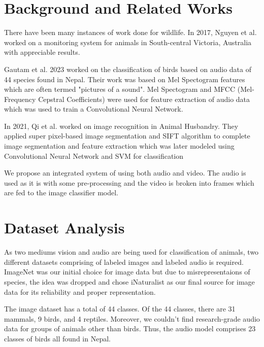 \documentclass[fleqn, 10pt, twoside]{IOEGC}
\begin{document}
\section{Background and Related Works}
There have been many instances of work done for wildlife. In 2017, Nguyen et al.\cite{r4} worked on a monitoring system for animals in South-central Victoria, Australia with appreciable results.
\par
Gautam et al. 2023 \cite{r5} worked on the classification of birds based on audio data of 44 species found in Nepal. Their work was based on Mel Spectogram features which are often termed "pictures of a sound". Mel Spectogram and MFCC (Mel-Frequency Cepstral Coefficients) were used for feature extraction of audio data which was used to train a Convolutional Neural Network.
\par
In 2021, Qi et al. \cite{r6} worked on image recognition in Animal Husbandry. They applied super pixel-based image segmentation and SIFT algorithm to complete image segmentation and feature extraction which was later modeled using Convolutional Neural Network and SVM for classification
\par
We propose an integrated system of using both audio and video. The audio is used as it is with some pre-processing and the video is broken into frames which are fed to the image classifier model.

\section{Dataset Analysis}
As two mediums vision and audio are being used for classification of animals, two different datasets comprising of labeled images and labeled audio is required. ImageNet was our initial choice for image data but due to misrepresentaions of species, the idea was dropped and chose iNaturalist as our final source for image data for its reliability and proper representation.\cite{r10}
\par
The image dataset has a total of 44 classes. Of the 44 classes, there are 31 mammals, 9 birds, and 4 reptiles. Moreover, we couldn’t find research-grade audio data for groups of animals other than birds. Thus, the audio model comprises 23 classes of birds all found in Nepal.
\end{document}
